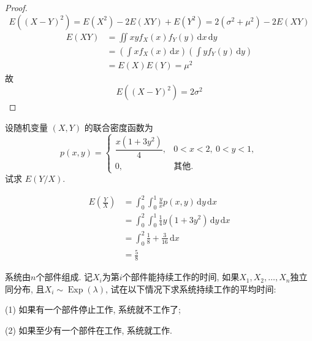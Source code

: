 \documentclass[../main.tex]{subfiles}
\begin{document}
\begin{proof}
 \[
 E\left( \left( X-Y \right)^{2}  \right)= E\left( X^{2} \right)-2E\left( XY \right)+ E\left( Y^{2} \right)= 2 \left(  \sigma ^{2}+ \mu ^{2} \right) -2E\left( XY \right)     
 \] \[
 \begin{aligned}
 E\left( XY \right)&= \iint xyf_{X}\left( x \right)f_{Y}\left( y \right)\,\mathrm{d} x\,\mathrm{d} y\\ 
  &=     \left( \int xf_{X}\left( x \right)  \,\mathrm{d} x\right)\left( \int yf_{Y}\left( y \right)\,\mathrm{d} y  \right)\\ 
   &= E\left( X \right)E\left( Y \right)    = \mu ^{2}
 \end{aligned}
 \]故 \[
 E\left( \left( X-Y \right)^{2}  \right)= 2 \sigma ^{2}
 \]
\end{proof}
\begin{exercise}{}{}
设随机变量 $(X,Y)$ 的联合密度函数为
\[
p(x,y)=
\begin{cases}
\dfrac{x(1+3y^2)}{4}, & 0<x<2,\ 0<y<1,\\
0, & \text{其他}.
\end{cases}
\]
试求 $E(Y/X)$.
\end{exercise}
\begin{solution}
  \[
  \begin{aligned}
  E\left( \frac{Y}{X} \right)&=  \int_{0}^{2}\int_{0}^{1} \frac{y }{x } p\left( x,y \right)\,\mathrm{d} y\,\mathrm{d} x\\ 
   &=     \int_{0}^{2}\int_{0}^{1}\frac{1 }{4 }y\left( 1+ 3y^{2} \right)\,\mathrm{d} y\,\mathrm{d} x\\ 
    &= \int_{0}^{2} \frac{1}{8}+ \frac{3}{16}\,\mathrm{d} x\\ 
     &= \frac{5}{8}  
  \end{aligned}
  \]
\end{solution}

\begin{exercise}{}{}
系统由$n$个部件组成. 记$X_i$为第$i$个部件能持续工作的时间, 如果$X_1,X_2,\dots,X_n$独立同分布, 且$X_i\sim \operatorname{Exp}(\lambda)$, 试在以下情况下求系统持续工作的平均时间:

(1) 如果有一个部件停止工作, 系统就不工作了;

(2) 如果至少有一个部件在工作, 系统就工作.
\end{exercise}
\end{document}
